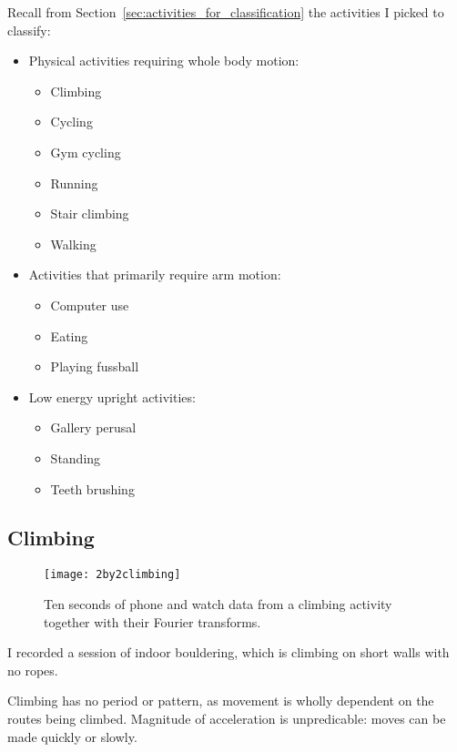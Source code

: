     Recall from Section~\ref{sec:activities_for_classification} the activities I picked to classify:
    \begin{itemize}
      \item Physical activities requiring whole body motion:
      \begin{itemize}
        \item Climbing
        \item Cycling
        \item Gym cycling
        \item Running
        \item Stair climbing
        \item Walking
      \end{itemize} 
      \item Activities that primarily require arm motion:
      \begin{itemize}
        \item Computer use
        \item Eating
        \item Playing fussball
      \end{itemize}
      \item Low energy upright activities:
      \begin{itemize}
        \item Gallery perusal
        \item Standing
        \item Teeth brushing
      \end{itemize}
    \end{itemize}
    \pagebreak[4]
    \subsection{Climbing}
      \begin{figure}[!th]
        \centering
        \texttt{[image: 2by2climbing]}
        \caption[Climbing sample]{Ten seconds of phone and watch data from a climbing activity together with their Fourier transforms.}
        \label{fig:2by2climbing }
      \end{figure}
      
      I recorded a session of indoor bouldering, which is climbing on short walls with no ropes.
      
      Climbing has no period or pattern, as movement is wholly dependent on the routes being climbed. Magnitude of acceleration is unpredicable: moves can be made quickly or slowly.
      

